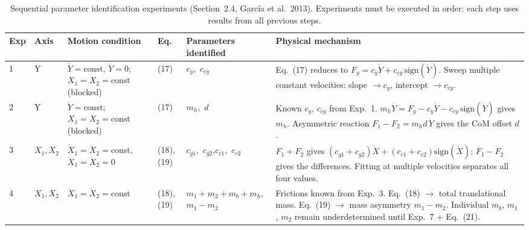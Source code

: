 \documentclass[a4paper, 11pt]{article}
\begin{document}
\begin{table}[htbp]
\centering
\caption{Sequential parameter identification experiments (Section~2.4, Garc\'{i}a et al.\ 2013).
Experiments must be executed in order: each step uses results from all previous steps.}
\label{tab:garcia_experiments}
\small
\renewcommand{\arraystretch}{1.6}
\begin{tabular}{C{0.5cm} C{0.9cm} L{3.2cm} C{1.0cm} L{3.2cm} L{5.0cm}}
\toprule
\textbf{Exp} & \textbf{Axis} & \textbf{Motion condition} & \textbf{Eq.} & \textbf{Parameters identified} & \textbf{Physical mechanism} \\
\midrule

1 & Y &
$\dot{Y} = \text{const}$, $\ddot{Y} = 0$;\newline $X_1 = X_2 = \text{const}$ (blocked) &
(17) &
$c_y$,\ $c_{cy}$ &
Eq.~(17) reduces to $F_y = c_y \dot{Y} + c_{cy}\,\mathrm{sign}(\dot{Y})$. Sweep multiple
constant velocities: slope $\rightarrow c_y$, intercept $\rightarrow c_{cy}$. \\

\midrule

2 & Y &
$\ddot{Y} = \text{const}$;\newline $X_1 = X_2 = \text{const}$ (blocked) &
(17) &
$m_h$,\ $d$ &
Known $c_y$, $c_{cy}$ from Exp.~1. $m_h\ddot{Y} = F_y - c_y\dot{Y} - c_{cy}\,\mathrm{sign}(\dot{Y})$
gives $m_h$. Asymmetric reaction $F_1 - F_2 = m_h d\,\ddot{Y}$ gives the CoM offset $d$. \\

\midrule

3 & $X_1, X_2$ &
$\dot{X}_1 = \dot{X}_2 = \text{const}$,\newline $\ddot{X}_1 = \ddot{X}_2 = 0$ &
(18),(19) &
$c_{g1}$,\ $c_{g2}$,\newline $c_{c1}$,\ $c_{c2}$ &
$F_1 + F_2$ gives $(c_{g1}+c_{g2})\dot{X} + (c_{c1}+c_{c2})\mathrm{sign}(\dot{X})$;
$F_1 - F_2$ gives the differences. Fitting at multiple velocities separates all four values. \\

\midrule

4 & $X_1, X_2$ &
$\ddot{X}_1 = \ddot{X}_2 = \text{const}$ &
(18),(19) &
$m_1{+}m_2{+}m_b{+}m_h$,\newline $m_1{-}m_2$ &
Frictions known from Exp.~3. Eq.~(18) $\rightarrow$ total translational mass.
Eq.~(19) $\rightarrow$ mass asymmetry $m_1 - m_2$.
Individual $m_b$, $m_1$, $m_2$ remain underdetermined until Exp.~7 + Eq.~(21). \\


\end{tabular}
\end{table}
\end{document}
